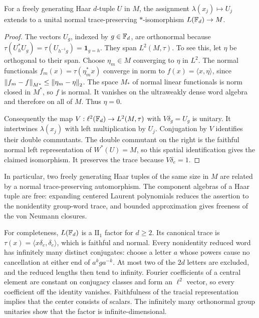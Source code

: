 \begin{lemma}\label{lem:haar-identification}
For a freely generating Haar $d$-tuple $U$ in $M$, the assignment $\lambda(x_j)\mapsto U_j$ extends to a unital normal trace-preserving $*$-isomorphism $L(\mathbb F_d)\to M$.
\end{lemma}
\begin{proof}
The vectors $U_g$, indexed by $g\in\mathbb F_d$, are orthonormal because
$\tau(U_h^*U_g)=\tau(U_{h^{-1}g})=\mathbf 1_{g=h}$.
They span $L^2(M,\tau)$. To see this, let $\eta$ be orthogonal to their span. Choose $\eta_m\in M$ converging to $\eta$ in $L^2$. The normal functionals $f_m(x)=\tau(\eta_m^*x)$ converge in norm to $f(x)=\langle x,\eta\rangle$, since $\left\lVert f_m-f\right\rVert_{M^*}\leq\left\lVert \eta_m-\eta\right\rVert_2$. The space $M_*$ of normal linear functionals is norm closed in $M^*$, so $f$ is normal. It vanishes on the ultraweakly dense word algebra and therefore on all of $M$. Thus $\eta=0$.

Consequently the map $V:\ell^2(\mathbb F_d)\to L^2(M,\tau)$ with $V\delta_g=U_g$ is unitary. It intertwines $\lambda(x_j)$ with left multiplication by $U_j$. Conjugation by $V$ identifies their double commutants. The double commutant on the right is the faithful normal left representation of $W^*(U)=M$, so this spatial identification gives the claimed isomorphism. It preserves the trace because $V\delta_e=1$.
\end{proof}

In particular, two freely generating Haar tuples of the same size in $M$ are related by a normal trace-preserving automorphism. The component algebras of a Haar tuple are free: expanding centered Laurent polynomials reduces the assertion to the nonidentity group-word trace, and bounded approximation gives freeness of the von Neumann closures.

For completeness, $L(\mathbb F_d)$ is a $\mathrm{II}_1$ factor for $d\geq2$. Its canonical trace is $\tau(x)=\langle x\delta_e,\delta_e\rangle$, which is faithful and normal. Every nonidentity reduced word has infinitely many distinct conjugates: choose a letter $a$ whose powers cause no cancellation at either end of $a^kga^{-k}$. At most two of the $2d$ letters are excluded, and the reduced lengths then tend to infinity. Fourier coefficients of a central element are constant on conjugacy classes and form an $\ell^2$ vector, so every coefficient off the identity vanishes. Faithfulness of the tracial representation implies that the center consists of scalars. The infinitely many orthonormal group unitaries show that the factor is infinite-dimensional.

